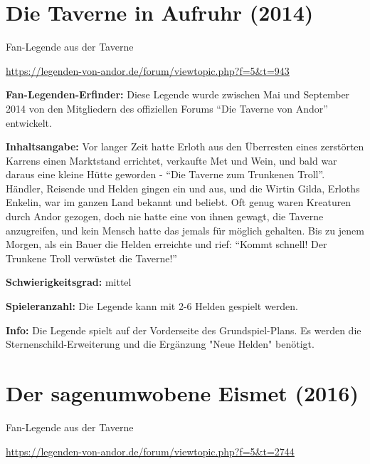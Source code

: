 {\parindent0pt

\section{Die Taverne in Aufruhr (2014)}

\begin{center}
    Fan-Legende aus der Taverne

    \url{https://legenden-von-andor.de/forum/viewtopic.php?f=5&t=943}
\end{center}




\textbf{Fan-Legenden-Erfinder:} Diese Legende wurde zwischen Mai und September 2014 von den Mitgliedern des offiziellen Forums “Die Taverne von Andor” entwickelt.

\textbf{Inhaltsangabe:} Vor langer Zeit hatte Erloth aus den Überresten eines zerstörten Karrens einen Marktstand errichtet, verkaufte Met und Wein, und bald war daraus eine kleine Hütte geworden - “Die Taverne zum Trunkenen Troll”. Händler, Reisende und Helden gingen ein und aus, und die Wirtin Gilda, Erloths Enkelin, war im ganzen Land bekannt und beliebt. Oft genug waren Kreaturen durch Andor gezogen, doch nie hatte eine von ihnen gewagt, die Taverne anzugreifen, und kein Mensch hatte das jemals für möglich gehalten. Bis zu jenem Morgen, als ein Bauer die Helden erreichte und rief: “Kommt schnell! Der Trunkene Troll verwüstet die Taverne!”

\textbf{Schwierigkeitsgrad:} mittel

\textbf{Spieleranzahl:} Die Legende kann mit 2-6 Helden gespielt werden.

\textbf{Info:}
Die Legende spielt auf der Vorderseite des Grundspiel-Plans. Es werden die Sternenschild-Erweiterung und die Ergänzung "Neue Helden" benötigt.









\newpage
\section{Der sagenumwobene Eismet (2016)}

\begin{center}
    Fan-Legende aus der Taverne

    \url{https://legenden-von-andor.de/forum/viewtopic.php?f=5&t=2744}
\end{center}



}
